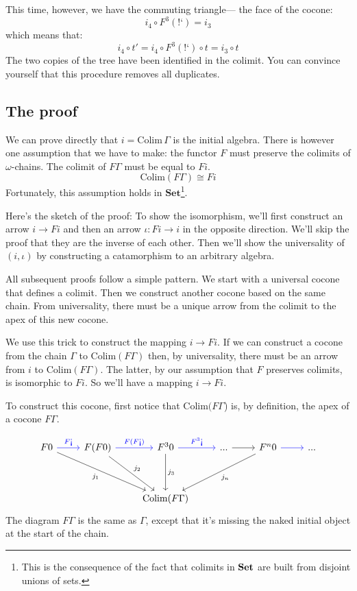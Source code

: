 \documentclass[DaoFP]{subfiles}
\begin{document}
This time, however, we have the commuting triangle--- the face of the cocone:
\[i_4 \circ F^3 (\mbox{!`}) = i_3 \]
which means that:
\[ i_4 \circ t' =  i_4 \circ F^3 (\mbox{!`}) \circ t =  i_3 \circ t\]
The two copies of the tree have been identified in the colimit. You can convince yourself that this procedure removes all duplicates.

\subsection{The proof}

We can  prove directly that $i = \text{Colim}\, \Gamma$ is the initial algebra. There is however one assumption that we have to make: the functor $F$ must preserve the colimits of $\omega$-chains. The colimit of $F \Gamma$ must be equal to $F i$.
\[ \text{Colim} (F \Gamma) \cong F i \]
Fortunately, this assumption holds in $\mathbf{Set}$\footnote{This is the consequence of the fact that colimits in $\mathbf{Set}$ are built from disjoint unions of sets.}. 

Here's the sketch of the proof: To show the isomorphism, we'll first construct an arrow $i \to F i$ and then an arrow $\iota \colon F i \to i$ in the opposite direction. We'll skip the proof that they are the inverse of each other. Then we'll show the universality of $(i, \iota)$ by constructing a catamorphism to an arbitrary algebra.

All subsequent proofs follow a simple pattern. We start with a universal cocone that defines a colimit. Then we construct another cocone based on the same chain. From universality, there must be a unique arrow from the colimit to the apex of this new cocone.

We use this trick to construct the mapping $i \to F i$. If we can construct a cocone from the chain $\Gamma$ to $\text{Colim} (F \Gamma)$ then, by universality, there must be an arrow from $i$ to $\text{Colim} (F \Gamma)$. The latter, by our assumption that $F$ preserves colimits, is isomorphic to $F i$. So we'll have a mapping $i \to F i$.

To construct this cocone, first notice that $\text{Colim} (F \Gamma$) is, by definition, the apex of a cocone $F \Gamma$. 

\[
 \begin{tikzcd}
 F 0
 \arrow[r, blue, "F \mbox{!`}"]
 \arrow[ddrr, "j_1"']
 &  F (F 0)
  \arrow[r, blue, "F(F  \mbox{!`})"]
 \arrow[ddr, "j_2"]
& F^3 0
  \arrow[r, blue, "F^3\mbox{!`}"]
  \arrow[dd, "j_3"]
 & ...
 \arrow[r]
 & F^n 0
  \arrow[r, blue]
 \arrow[ddll, "j_n"]
 & ...
 \\
 \\
 &&\text{Colim} (F \Gamma)
  \end{tikzcd}
\]
The diagram $F \Gamma$ is the same as $\Gamma$, except that it's missing the naked initial object at the start of the chain.
\end{document}
